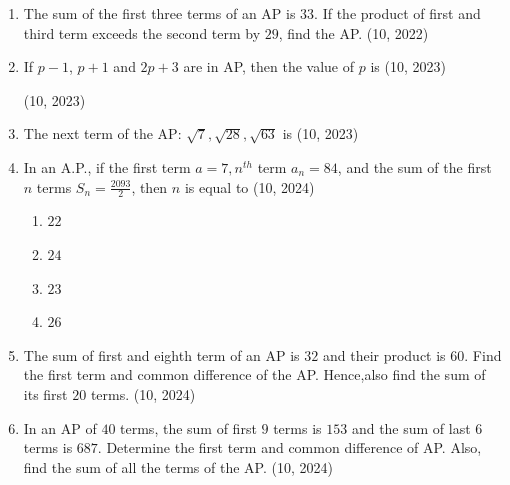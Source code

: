 \begin{enumerate}[label=\thesubsection.\arabic*,ref=\thesubsection.\theenumi,itemsep=1pt]
 \item The sum of the first three terms of an AP is $33$. If the product of first and third term exceeds the second term by $29$, find the AP.
         \hfill (10, 2022)    
 \item If $p-1$, $p+1$ and $2p+3$ are in AP, then the value of $p$ is
        \hfill (10, 2023)
        \begin{enumerate}
      \end{enumerate}
    \hfill (10, 2023) 
\item The next term of the AP: $\sqrt{7}, \sqrt{28}, \sqrt{63}$ is 
\hfill (10, 2023)
    \begin{enumerate}
    \end{enumerate}
\item In an A.P., if the first term $a = 7, n^{th}$ term $a_{n} = 84$, and the sum of the first $n$ terms $S_{n} = \frac{2093}{2}$, then $n$ is equal to
\hfill (10, 2024)
\begin{enumerate}
    \item $22$
    \item $24$
    \item $23$
    \item $26$
\end{enumerate}
\item  The sum of first and eighth term of an AP is $32$ and their product is $60$. Find the first term  and common difference of the AP. Hence,also find the sum of its first $20$ terms.
\hfill (10, 2024)
\item In an AP of $40$ terms, the sum of first $9$ terms is $153$ and the sum of last $6$ terms is $687$.
Determine the first term and common difference of AP. Also, find the sum of all the terms of the AP.
\hfill (10, 2024)


\end{enumerate}
%

